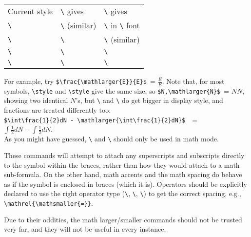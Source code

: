 \documentclass[12pt,pagesize=auto]{scrartcl}
\makeatletter
\newcommand*{\cs}[1]{\texttt{\textbackslash#1}}
\newcommand*{\cmd}[1]{\cs{\expandafter\@gobble\string#1}}
\makeatother
\begin{document}
\medskip
\begin{center}
  \small
  \begin{tabular*}{\textwidth}{@{\extracolsep{\fill}}lll@{}}
    \toprule
    Current style            & \cmd{\mathsmaller} gives  & \cmd{\mathlarger} gives  \\
    \cmidrule(r){1-1}         \cmidrule(lr){2-2}         \cmidrule(l){3-3}
    \cmd{\displaystyle}      & \cmd{\textstyle} (similar)& \cmd{\displaystyle} in \cmd{\larger} font \\
    \cmd{\textstyle}         & \cmd{\scriptstyle}        & \cmd{\displaystyle} (similar) \\
    \cmd{\scriptstyle}       & \cmd{\scriptscriptstyle}  & \cmd{\textstyle}   \\
    \cmd{\scriptscriptstyle} & \cmd{\scriptscriptstyle}  & \cmd{\scriptstyle} \\
    \bottomrule
  \end{tabular*}
\end{center}

\noindent For example, try \verb+$\frac{\mathlarger{E}}{E}$+~= $\frac{\textstyle E}{E}$.  
Note that, for most symbols,
\cmd{\display\-style} and \cmd{\text\-style} give the same size, so 
\verb+$N,\mathlarger{N}$+~= $N\displaystyle N$, showing two identical $N$'s, 
but \cmd{\sum} and \cmd{\int} do get bigger in display style, 
and fractions are treated differently too: \\
\verb+$\int\frac{1}{2}dN - \mathlarger{\int\frac{1}{2}dN}$+~~=~
$\int\frac{1}{2}dN - \displaystyle{\int\frac{1}{2}dN}$.\\[3pt]
As you might have guessed, \cmd{\mathlarger} and \cmd{\mathsmaller} 
should only be used in math mode.

These commands will attempt to attach any superscripts and subscripts 
directly to the symbol within the braces, rather than how they would attach 
to a math sub-formula.  On the other hand, math accents and the math 
spacing do behave as if the symbol is enclosed in braces (which it is).  
Operators should be explicitly declared to use the right operator
type (\cmd{\mathrel}, \cmd{\mathbin}, \cmd{\mathop}) to get the correct 
spacing, e.g., \verb+\mathrel{\mathsmaller{=}}+.

Due to their oddities, the math larger/smaller commands should not be 
trusted very far, and they will not be useful in every instance.
\end{document}
